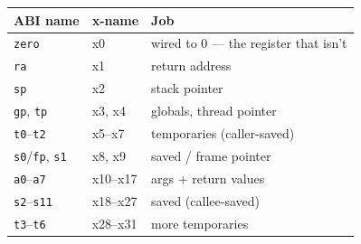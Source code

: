 \begin{center}
\begin{tabularx}{0.95\linewidth}{llX}
\toprule
\textbf{ABI name} & \textbf{x-name} & \textbf{Job} \\
\midrule
\texttt{zero} & x0 & wired to 0 --- the register that isn't \\
\texttt{ra} & x1 & return address \\
\texttt{sp} & x2 & stack pointer \\
\texttt{gp}, \texttt{tp} & x3, x4 & globals, thread pointer \\
\texttt{t0}--\texttt{t2} & x5--x7 & temporaries (caller-saved) \\
\texttt{s0}/\texttt{fp}, \texttt{s1} & x8, x9 & saved / frame pointer \\
\texttt{a0}--\texttt{a7} & x10--x17 & args + return values \\
\texttt{s2}--\texttt{s11} & x18--x27 & saved (callee-saved) \\
\texttt{t3}--\texttt{t6} & x28--x31 & more temporaries \\
\bottomrule
\end{tabularx}
\end{center}
